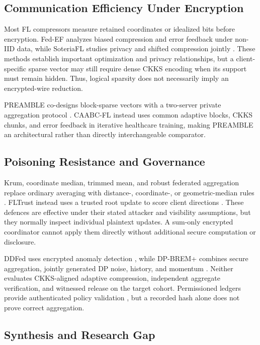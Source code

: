 \documentclass[conference]{IEEEtran}
\begin{document}
\subsection{Communication Efficiency Under Encryption}

Most FL compressors measure retained coordinates or idealized bits before
encryption. Fed-EF analyzes biased compression and error feedback under non-IID
data, while SoteriaFL studies privacy and shifted compression jointly
\cite{li2023fedef,li2022soteriafl}. These methods establish important
optimization and privacy relationships, but a client-specific sparse vector may
still require dense CKKS encoding when its support must remain hidden. Thus,
logical sparsity does not necessarily imply an encrypted-wire reduction.

PREAMBLE co-designs block-sparse vectors with a two-server private aggregation
protocol \cite{asi2025preamble}. CAABC-FL instead uses common adaptive blocks,
CKKS chunks, and error feedback in iterative healthcare training, making
PREAMBLE an architectural rather than directly interchangeable comparator.

\subsection{Poisoning Resistance and Governance}

Krum, coordinate median, trimmed mean, and robust federated aggregation replace
ordinary averaging with distance-, coordinate-, or geometric-median rules
\cite{blanchard2017krum,yin2018byzantine,pillutla2022robust}. FLTrust instead
uses a trusted root update to score client directions \cite{cao2021fltrust}.
These defences are effective under their stated attacker and visibility
assumptions, but they normally inspect individual plaintext updates. A sum-only
encrypted coordinator cannot apply them directly without additional secure
computation or disclosure.

DDFed uses encrypted anomaly detection \cite{xu2024ddfed}, while DP-BREM+
combines secure aggregation, jointly generated DP noise, history, and momentum
\cite{gu2025dpbrem}. Neither evaluates CKKS-aligned adaptive compression,
independent aggregate verification, and witnessed release on the target cohort.
Permissioned ledgers provide authenticated policy validation
\cite{androulaki2018hyperledger}, but a recorded hash alone does not prove
correct aggregation.

\subsection{Synthesis and Research Gap}
\end{document}

